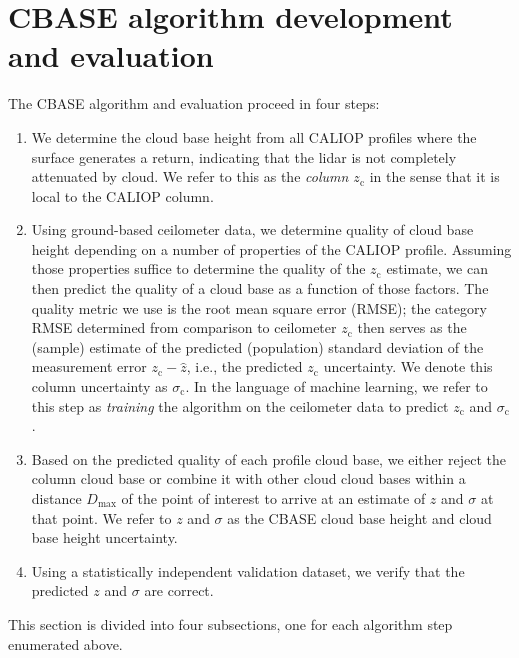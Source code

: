 \documentclass[essd,manuscript]{copernicus}
\begin{document}
\section{CBASE algorithm development and evaluation}
\label{sec:algorithm}

The CBASE algorithm and evaluation proceed in four steps:
\begin{enumerate}
\item We determine the cloud base height from all CALIOP profiles where the
  surface generates a return, indicating that the lidar is not completely
  attenuated by cloud.  We refer to this as the \textit{column
    \ensuremath{z_\text{c}}{}} in the sense that it is local to the CALIOP column.
\item Using ground-based ceilometer data, we determine quality of cloud base
  height depending on a number of properties of the CALIOP profile.  Assuming
  those properties suffice to determine the quality of the \ensuremath{z_\text{c}}{} estimate, we
  can then predict the quality of a cloud base as a function of those factors.
  The quality metric we use is the root mean square error (RMSE); the category
  RMSE determined from comparison to ceilometer \ensuremath{z_\text{c}}{} then serves as the
  (sample) estimate of the predicted (population) standard deviation of the
  measurement error $\ensuremath{z_\text{c}} - \hat{z}$, i.e., the predicted \ensuremath{z_\text{c}}{}
  uncertainty.  We denote this column uncertainty as $\ensuremath{\sigma_\text{c}}$.  In the language
  of machine learning, we refer to this step 
  as \textit{training} the algorithm on the ceilometer data to predict \ensuremath{z_\text{c}}{} and
  $\ensuremath{\sigma_\text{c}}$.
\item Based on the predicted quality of each profile cloud base, we either reject
  the column cloud base or combine it with other cloud cloud bases within a
  distance $D_\text{max}$ of the point of interest to arrive at an 
  estimate of \ensuremath{z}{} and $\sigma$ at that point.  We refer to \ensuremath{z}{} and $\sigma$
  as the CBASE cloud base height and cloud base height uncertainty.
\item Using a statistically independent validation dataset, we verify that the
  predicted \ensuremath{z}{} and $\sigma$ are correct.
\end{enumerate}

This section is divided into four subsections, one for each algorithm step
enumerated above.
\end{document}
